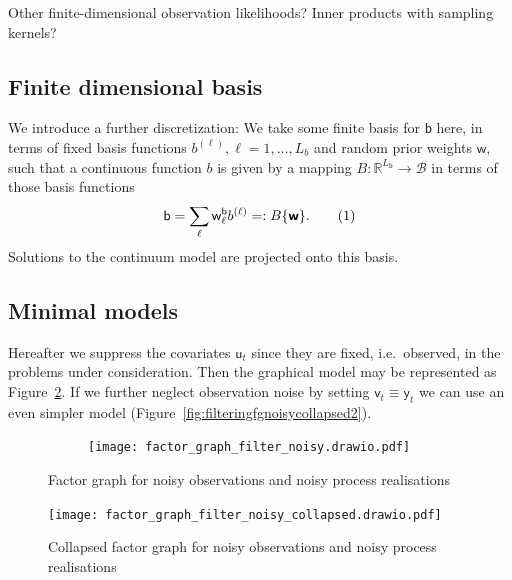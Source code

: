 \documentclass{article}
\newcommand\numberthis{\addtocounter{equation}{1}\tag{\theequation}}
\newcommand{\vv}[1]{\boldsymbol{#1}}
\newcommand{\rv}[1]{\mathsf{#1}}
\newcommand{\vrv}[1]{\vv{\rv{#1}}}
\newcommand{\lat}{\rv{b}}   %
\newcommand{\latst}{b}      %
\newcommand{\latsp}{\mathcal{B}}
\newcommand{\latwt}{\vrv{w}}
\begin{document}
Other finite-dimensional observation likelihoods? Inner products with sampling kernels?

\subsection{Finite dimensional basis}

We introduce a further discretization:
We take some finite basis for \(\lat\) here, in terms of fixed basis functions \(b^{(\ell)}, \ell=1,\dots,L_b\) and random prior weights \(\latwt\), such that a continuous function \(\latst\) is given by a mapping \(B:\mathbb{R}^{L_{\lat}}\to \latsp\) in terms of those basis functions
\begin{align*}
    \lat
    =\sum_{\ell}\rv{w}^{\lat}_{\ell}\latst^{(\ell)}
    =:B\{\vrv{w}\}.\label{eq:lat_basis}\numberthis
\end{align*}
Solutions to the continuum model are projected onto this basis.

\subsection{Minimal models}

Hereafter we suppress the covariates \(\rv{u}_{t}\) since they are fixed, i.e.~observed, in the problems under consideration.
Then the graphical model may be represented as Figure~\ref{fig:filteringfgnoisycollapsed}.
If we further neglect observation noise by setting \(\rv{v}_{t}\equiv \rv{y}_{t}\) we can use an even simpler model (Figure~\ref{fig:filteringfgnoisycollapsed2}).

\begin{figure}[htb]
  \centering
  \begin{subfigure}[b]{0.65\textwidth}
    \centering
    \texttt{[image: factor\_graph\_filter\_noisy.drawio.pdf]}
  \end{subfigure}
  \caption{Factor graph for noisy observations and noisy process realisations}\label{fig:filteringfgnoisy}
\end{figure}


\begin{figure}[htb]
  \centering
    \texttt{[image: factor\_graph\_filter\_noisy\_collapsed.drawio.pdf]}
  \caption{Collapsed factor graph for noisy observations and noisy process realisations}\label{fig:filteringfgnoisycollapsed}
\end{figure}
\end{document}
